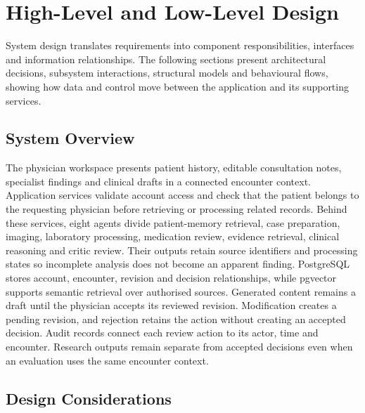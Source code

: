 \begingroup
\renewcommand{\encodingdefault}{T1}
\selectfont
\chapter{High-Level and Low-Level Design}

System design translates requirements into component responsibilities, interfaces and information relationships. The following sections present architectural decisions, subsystem interactions, structural models and behavioural flows, showing how data and control move between the application and its supporting services.

\section{System Overview}

The physician workspace presents patient history, editable consultation notes, specialist findings and clinical drafts in a connected encounter context. Application services validate account access and check that the patient belongs to the requesting physician before retrieving or processing related records. Behind these services, eight agents divide patient-memory retrieval, case preparation, imaging, laboratory processing, medication review, evidence retrieval, clinical reasoning and critic review. Their outputs retain source identifiers and processing states so incomplete analysis does not become an apparent finding. PostgreSQL stores account, encounter, revision and decision relationships, while pgvector supports semantic retrieval over authorised sources. Generated content remains a draft until the physician accepts its reviewed revision. Modification creates a pending revision, and rejection retains the action without creating an accepted decision. Audit records connect each review action to its actor, time and encounter. Research outputs remain separate from accepted decisions even when an evaluation uses the same encounter context.

\section{Design Considerations}

